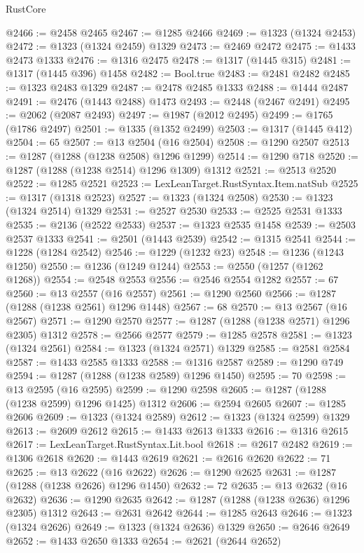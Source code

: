 \begin{lexlean}{RustCore}
\begin{coremodule}
@2466 := @2458 @2465
@2467 := @1285 @2466
@2469 := @1323 (@1324 @2453)
@2472 := @1323 (@1324 @2459) @1329
@2473 := @2469 @2472
@2475 := @1433 @2473 @1333
@2476 := @1316 @2475
@2478 := @1317 (@1445 @315)
@2481 := @1317 (@1445 @396) @1458
@2482 := Bool.true
@2483 := @2481 @2482
@2485 := @1323 @2483 @1329
@2487 := @2478 @2485 @1333
@2488 := @1444 @2487
@2491 := @2476 (@1443 @2488) @1473
@2493 := @2448 (@2467 @2491)
@2495 := @2062 (@2087 @2493)
@2497 := @1987 (@2012 @2495)
@2499 := @1765 (@1786 @2497)
@2501 := @1335 (@1352 @2499)
@2503 := @1317 (@1445 @412)
@2504 := 65
@2507 := @13 @2504 (@16 @2504)
@2508 := @1290 @2507
@2513 := @1287 (@1288 (@1238 @2508) @1296 @1299)
@2514 := @1290 @718
@2520 := @1287 (@1288 (@1238 @2514) @1296 @1309) @1312
@2521 := @2513 @2520
@2522 := @1285 @2521
@2523 := LexLeanTarget.RustSyntax.Item.natSub
@2525 := @1317 (@1318 @2523)
@2527 := @1323 (@1324 @2508)
@2530 := @1323 (@1324 @2514) @1329
@2531 := @2527 @2530
@2533 := @2525 @2531 @1333
@2535 := @2136 (@2522 @2533)
@2537 := @1323 @2535 @1458
@2539 := @2503 @2537 @1333
@2541 := @2501 (@1443 @2539)
@2542 := @1315 @2541
@2544 := @1228 (@1284 @2542)
@2546 := @1229 (@1232 @23)
@2548 := @1236 (@1243 @1250)
@2550 := @1236 (@1249 @1244)
@2553 := @2550 (@1257 (@1262 @1268))
@2554 := @2548 @2553
@2556 := @2546 @2554 @1282
@2557 := 67
@2560 := @13 @2557 (@16 @2557)
@2561 := @1290 @2560
@2566 := @1287 (@1288 (@1238 @2561) @1296 @1448)
@2567 := 68
@2570 := @13 @2567 (@16 @2567)
@2571 := @1290 @2570
@2577 := @1287 (@1288 (@1238 @2571) @1296 @2305) @1312
@2578 := @2566 @2577
@2579 := @1285 @2578
@2581 := @1323 (@1324 @2561)
@2584 := @1323 (@1324 @2571) @1329
@2585 := @2581 @2584
@2587 := @1433 @2585 @1333
@2588 := @1316 @2587
@2589 := @1290 @749
@2594 := @1287 (@1288 (@1238 @2589) @1296 @1450)
@2595 := 70
@2598 := @13 @2595 (@16 @2595)
@2599 := @1290 @2598
@2605 := @1287 (@1288 (@1238 @2599) @1296 @1425) @1312
@2606 := @2594 @2605
@2607 := @1285 @2606
@2609 := @1323 (@1324 @2589)
@2612 := @1323 (@1324 @2599) @1329
@2613 := @2609 @2612
@2615 := @1433 @2613 @1333
@2616 := @1316 @2615
@2617 := LexLeanTarget.RustSyntax.Lit.bool
@2618 := @2617 @2482
@2619 := @1306 @2618
@2620 := @1443 @2619
@2621 := @2616 @2620
@2622 := 71
@2625 := @13 @2622 (@16 @2622)
@2626 := @1290 @2625
@2631 := @1287 (@1288 (@1238 @2626) @1296 @1450)
@2632 := 72
@2635 := @13 @2632 (@16 @2632)
@2636 := @1290 @2635
@2642 := @1287 (@1288 (@1238 @2636) @1296 @2305) @1312
@2643 := @2631 @2642
@2644 := @1285 @2643
@2646 := @1323 (@1324 @2626)
@2649 := @1323 (@1324 @2636) @1329
@2650 := @2646 @2649
@2652 := @1433 @2650 @1333
@2654 := @2621 (@2644 @2652)

\end{coremodule}
\end{lexlean}
